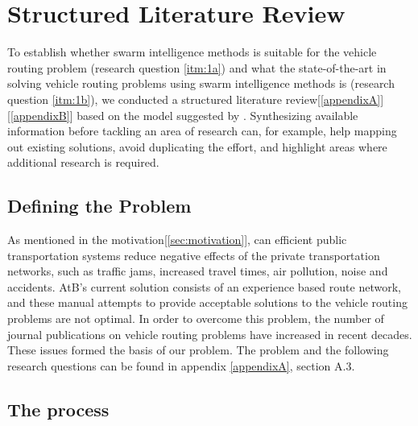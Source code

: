 \section{Structured Literature Review}

To establish whether swarm intelligence methods is suitable for the vehicle routing problem (research question \ref{itm:1a}) and what the state-of-the-art in solving vehicle routing problems using swarm intelligence methods is (research question \ref{itm:1b}), we conducted a structured literature review[\ref{appendixA}][\ref{appendixB}] based on the model suggested by \citet{kofod2014}. Synthesizing available information before tackling an area of research can, for example, help mapping out existing solutions, avoid duplicating the effort, and highlight areas where additional research is required\citep{kofod2014}. 

\subsection{Defining the Problem}

As mentioned in the motivation[\ref{sec:motivation}], can efficient public transportation systems reduce negative effects of the private transportation networks, such as traffic jams, increased travel times, air pollution, noise and accidents. AtB's current solution consists of an experience based route network, and these manual attempts to provide acceptable solutions to the vehicle routing problems are not optimal. In order to overcome this problem, the number of journal publications on vehicle routing problems have increased in recent decades. These issues formed the basis of our problem. The problem and the following research questions can be found in appendix \ref{appendixA}, section A.3. 

\subsection{The process}


